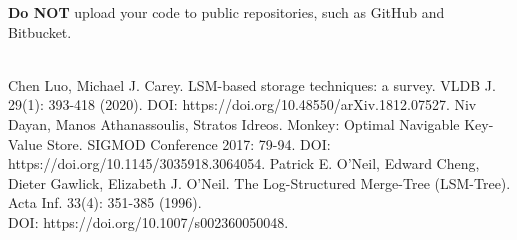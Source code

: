 \documentclass[12pt,a4paper,twoside]{article}
\newcommand{\assignmenttype}{Systems Project}       %
\newcommand{\assignmentnumber}{\hspace{-0.2em}}           %
\begin{document}

\noindent \textbf{Do NOT} upload your code to public repositories, such as GitHub and Bitbucket. \\\\



\begin{thebibliography}{9}
Chen Luo, Michael J. Carey. LSM-based storage techniques: a survey. VLDB J. 29(1): 393-418 (2020). DOI: https://doi.org/10.48550/arXiv.1812.07527.
Niv Dayan, Manos Athanassoulis, Stratos Idreos. Monkey: Optimal Navigable Key-Value Store. SIGMOD Conference 2017: 79-94. DOI: https://doi.org/10.1145/3035918.3064054.
Patrick E. O'Neil, Edward Cheng, Dieter Gawlick, Elizabeth J. O'Neil. The Log-Structured Merge-Tree (LSM-Tree). Acta Inf. 33(4): 351-385 (1996). \\DOI: https://doi.org/10.1007/s002360050048.
\end{thebibliography}
\end{document}
